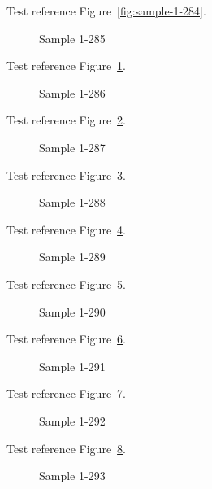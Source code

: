 Test reference Figure~\ref{fig:sample-1-284}.

\begin{figure}[tbhp]
\caption{Sample 1-285}
\label{fig:sample-1-285}
\end{figure}

Test reference Figure~\ref{fig:sample-1-285}.

\begin{figure}[tbhp]
\caption{Sample 1-286}
\label{fig:sample-1-286}
\end{figure}

Test reference Figure~\ref{fig:sample-1-286}.

\begin{figure}[tbhp]
\caption{Sample 1-287}
\label{fig:sample-1-287}
\end{figure}

Test reference Figure~\ref{fig:sample-1-287}.

\begin{figure}[tbhp]
\caption{Sample 1-288}
\label{fig:sample-1-288}
\end{figure}

Test reference Figure~\ref{fig:sample-1-288}.

\begin{figure}[tbhp]
\caption{Sample 1-289}
\label{fig:sample-1-289}
\end{figure}

Test reference Figure~\ref{fig:sample-1-289}.

\begin{figure}[tbhp]
\caption{Sample 1-290}
\label{fig:sample-1-290}
\end{figure}

Test reference Figure~\ref{fig:sample-1-290}.

\begin{figure}[tbhp]
\caption{Sample 1-291}
\label{fig:sample-1-291}
\end{figure}

Test reference Figure~\ref{fig:sample-1-291}.

\begin{figure}[tbhp]
\caption{Sample 1-292}
\label{fig:sample-1-292}
\end{figure}

Test reference Figure~\ref{fig:sample-1-292}.

\begin{figure}[tbhp]
\caption{Sample 1-293}
\label{fig:sample-1-293}
\end{figure}

